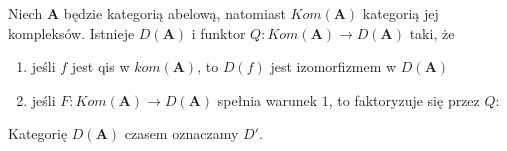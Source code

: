 \begin{theorem}
  Niech $\mathbf{A}$ będzie kategorią abelową, natomiast $Kom(\mathbf{A})$ kategorią jej kompleksów. Istnieje  $D(\mathbf{A})$ i funktor $Q:Kom(\mathbf{A})\to D(\mathbf{A})$ taki, że 
  \begin{enumerate}
    \item jeśli $f$ jest qis w $kom(\mathbf{A})$, to $D(f)$ jest izomorfizmem w $D(\mathbf{A})$
    \item jeśli $F:Kom(\mathbf{A})\to D(\mathbf{A})$ spełnia warunek $1$, to faktoryzuje się przez $Q$:
      \begin{center}\end{center}
  \end{enumerate}

  Kategorię $D(\mathbf{A})$ czasem oznaczamy $D'$.
\end{theorem}

